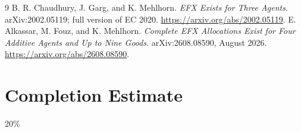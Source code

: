 \documentclass[11pt,a4paper]{article}
\theoremstyle{definition}
\theoremstyle{remark}
\begin{document}
\begin{thebibliography}{9}
 B. R. Chaudhury, J. Garg, and K. Mehlhorn. \emph{EFX Exists for Three Agents}. arXiv:2002.05119; full version of EC 2020. \url{https://arxiv.org/abs/2002.05119}.
 E. Alkassar, M. Fouz, and K. Mehlhorn. \emph{Complete EFX Allocations Exist for Four Additive Agents and Up to Nine Goods}. arXiv:2608.08590, August 2026. \url{https://arxiv.org/abs/2608.08590}.
\end{thebibliography}

\section{Completion Estimate}
20\%
\end{document}
